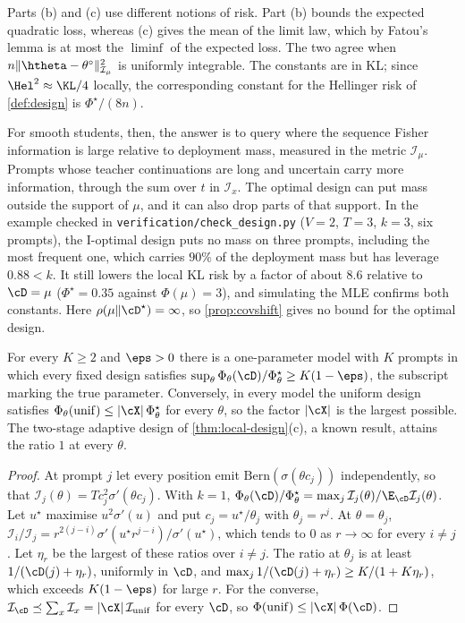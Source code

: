 \noindent
Parts (b) and (c) use different notions of risk. Part (b) bounds the expected quadratic loss, whereas (c)
gives the mean of the limit law, which by Fatou's lemma is at most the $\liminf$ of the expected loss. The
two agree when $n\|\htheta-\theta^\circ\|^2_{\mathcal I_\mu}$ is uniformly integrable. The constants are in KL; since
$\Hel^2\approx\KL/4$ locally, the corresponding constant for the Hellinger risk of \cref{def:design} is
$\Phi^\star/(8n)$.

For smooth students, then, the answer is to query where the sequence Fisher information is large
relative to deployment mass, measured in the metric $\mathcal I_\mu$. Prompts whose teacher continuations
are long and uncertain carry more information, through the sum over $t$ in $\mathcal I_x$. The optimal design
can put mass outside the support of $\mu$, and it can also drop parts of that support. In the example
checked in \texttt{verification/check\_design.py} ($V=2$, $T=3$, $k=3$, six prompts), the I-optimal design
puts no mass on three prompts, including the most frequent one, which carries $90\%$ of the deployment
mass but has leverage $0.88<k$. It still lowers the local KL risk by a factor of about $8.6$ relative to
$\cD=\mu$ ($\Phi^\star=0.35$ against $\Phi(\mu)=3$), and simulating the MLE confirms both constants. Here
$\rho(\mu\|\cD^\star)=\infty$, so \cref{prop:covshift} gives no bound for the optimal design.

\begin{proposition}\label{prop:adaptivity-gap}
\Pv\Ck For every $K\ge2$ and $\eps>0$ there is a one-parameter model with $K$ prompts in which every fixed
design satisfies $\sup_\theta\Phi_\theta(\cD)/\Phi^\star_\theta\ge K(1-\eps)$, the subscript marking the true parameter.
Conversely, in every model the uniform design satisfies $\Phi_\theta(\mathrm{unif})\le|\cX|\,\Phi^\star_\theta$ for every $\theta$, so
the factor $|\cX|$ is the largest possible. The two-stage adaptive design of \cref{thm:local-design}(c), a
known result, attains the ratio $1$ at every $\theta$.
\end{proposition}
\begin{proof}
At prompt $j$ let every position emit $\mathrm{Bern}(\sigma(\theta c_j))$ independently, so that
$\mathcal I_j(\theta)=Tc_j^2\sigma'(\theta c_j)$. With $k=1$, $\Phi_\theta(\cD)/\Phi^\star_\theta=\max_j\mathcal I_j(\theta)/\E_\cD\mathcal I_j(\theta)$. Let $u^\star$
maximise $u^2\sigma'(u)$ and put $c_j=u^\star/\theta_j$ with $\theta_j=r^j$. At $\theta=\theta_j$,
$\mathcal I_i/\mathcal I_j=r^{2(j-i)}\sigma'(u^\star r^{j-i})/\sigma'(u^\star)$, which tends to $0$ as $r\to\infty$ for every $i\ne j$. Let
$\eta_r$ be the largest of these ratios over $i\ne j$. The ratio at $\theta_j$ is at least $1/(\cD(j)+\eta_r)$, uniformly in
$\cD$, and $\max_j1/(\cD(j)+\eta_r)\ge K/(1+K\eta_r)$, which exceeds $K(1-\eps)$ for large $r$. For the converse,
$\mathcal I_\cD\preceq\sum_x\mathcal I_x=|\cX|\,\mathcal I_{\mathrm{unif}}$ for every $\cD$, so $\Phi(\mathrm{unif})\le|\cX|\,\Phi(\cD)$.
\end{proof}

